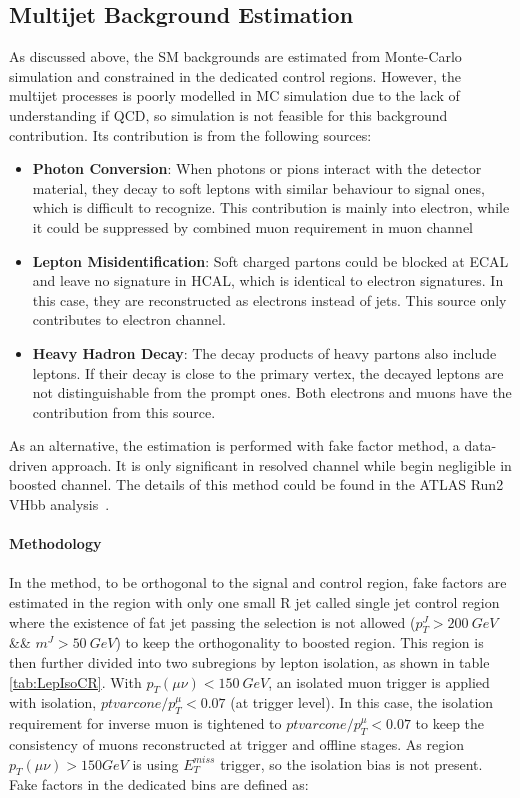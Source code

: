 \subsection{Multijet Background Estimation}
\label{sec:multijet_background}
As discussed above, the SM backgrounds are estimated from Monte-Carlo simulation and constrained in the dedicated control regions. However, the multijet processes is poorly modelled in MC simulation due to the lack of understanding if QCD, so simulation is not feasible for this background contribution. Its contribution is from the following sources:
\begin{itemize}
	\item {\bf Photon Conversion}: When photons or pions interact with the detector material, they decay to soft leptons with similar behaviour to signal ones, which is difficult to recognize. This contribution is mainly into electron, while it could be suppressed by combined muon requirement in muon channel
	\item {\bf Lepton Misidentification}: Soft charged partons could be blocked at ECAL and leave no signature in HCAL, which is identical to electron signatures. In this case, they are reconstructed as electrons instead of jets. This source only contributes to electron channel.
	\item {\bf Heavy Hadron Decay}: The decay products of heavy partons also include leptons. If their decay is close to the primary vertex, the decayed leptons are not distinguishable from the prompt ones. Both electrons and muons have the contribution from this source. 
\end{itemize}
\noindent
As an alternative, the estimation is performed with fake factor method, a data-driven approach. It is only significant in resolved channel while begin negligible in boosted channel.  The details of this method could be found in the ATLAS Run2 VHbb analysis~\cite{ATLAS-CONF-2016-091, ATL-COM-PHYS-2016-429}. 
\\
\\{\bf Methodology}
\\
\\In the method, to be orthogonal to the signal and control region, fake factors are estimated in the region with only one small R jet called single jet control region where the existence of fat jet passing the selection is not allowed ($p_{T}^{J}>200~GeV$ \&\& $m^{J}>50~GeV$) to keep the orthogonality to boosted region. This region is then further divided into two subregions by lepton isolation, as shown in table \ref{tab:LepIsoCR}. With $p_{T}(\mu\nu)<150~GeV$, an isolated muon trigger is applied with isolation, $ptvarcone/p^{\mu}_{T}<0.07$ (at trigger level). In this case, the isolation requirement for inverse muon is tightened to $ptvarcone/p^{\mu}_{T}<0.07$ to keep the consistency of muons reconstructed at trigger and offline stages. As region $p_{T}(\mu\nu)>150 GeV$ is using $E_{T}^{miss}$ trigger, so the isolation bias is not present. Fake factors in the dedicated bins are defined as:
